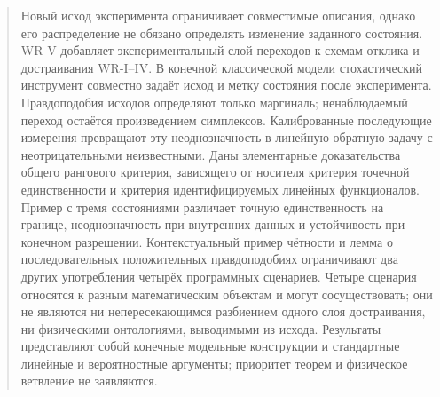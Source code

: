 \maketitle
\begin{abstract}
{Новый исход эксперимента ограничивает совместимые описания, однако его распределение не обязано определять изменение заданного состояния. WR-V добавляет экспериментальный слой переходов к схемам отклика и достраивания WR-I--IV. В конечной классической модели стохастический инструмент совместно задаёт исход и метку состояния после эксперимента. Правдоподобия исходов определяют только маргиналь; ненаблюдаемый переход остаётся произведением симплексов. Калиброванные последующие измерения превращают эту неоднозначность в линейную обратную задачу с неотрицательными неизвестными. Даны элементарные доказательства общего рангового критерия, зависящего от носителя критерия точечной единственности и критерия идентифицируемых линейных функционалов. Пример с тремя состояниями различает точную единственность на границе, неоднозначность при внутренних данных и устойчивость при конечном разрешении. Контекстуальный пример чётности и лемма о последовательных положительных правдоподобиях ограничивают два других употребления четырёх программных сценариев. Четыре сценария относятся к разным математическим объектам и могут сосуществовать; они не являются ни непересекающимся разбиением одного слоя достраивания, ни физическими онтологиями, выводимыми из исхода. Результаты представляют собой конечные модельные конструкции и стандартные линейные и вероятностные аргументы; приоритет теорем и физическое ветвление не заявляются.}
\end{abstract}
